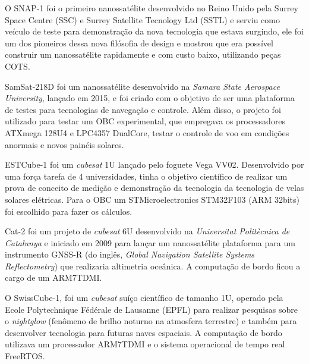 O SNAP-1 \cite{snap1_ref} foi o primeiro nanossatélite desenvolvido no Reino Unido pela Surrey Space Centre (SSC) e Surrey Satellite Tecnology Ltd (SSTL) e serviu como veículo de teste para demonstração da nova tecnologia que estava surgindo, ele foi um dos pioneiros dessa nova filósofia de design e mostrou que era possível construir um nanossatélite rapidamente e com custo baixo, utilizando peças COTS.

SamSat-218D \cite{samsat218_ref} foi um nanossatélite desenvolvido na \textit{Samara State Aerospace University}, lançado em 2015, e foi criado com o objetivo de ser uma plataforma de testes para tecnologias de navegação e controle. Além disso, o projeto foi utilizado para testar um OBC experimental, que empregava os processadores ATXmega 128U4 e LPC4357 DualCore, testar o controle de voo em condições anormais e novos painéis solares.

ESTCube-1 \cite{estcube1_ref} foi um \textit{cubesat} 1U lançado pelo foguete Vega VV02. Desenvolvido por uma força tarefa de 4 universidades, tinha o objetivo científico de realizar um prova de conceito de medição e demonstração da tecnologia da tecnologia de velas solares elétricas. Para o OBC um STMicroelectronics STM32F103 (ARM 32bits) foi escolhido para fazer os cálculos.

Cat-2 \cite{cat2_ref} foi um projeto de \textit{cubesat} 6U desenvolvido na \textit{Universitat Politècnica de Catalunya} e iniciado em 2009 para lançar um nanossatélite plataforma para um instrumento GNSS-R (do inglês, \textit{Global Navigation Satellite Systems Reflectometry}) que realizaria altimetria oceânica. A computação de bordo ficou a cargo de um ARM7TDMI.  

O SwissCube-1, \cite{swisscube_ref} foi um \textit{cubesat} suíço científico de tamanho 1U, operado pela Ecole Polytechnique Fédérale de Lausanne (EPFL) para realizar pesquisas sobre o \textit{nightglow} (fenômeno de brilho   noturno na atmosfera terrestre) e também para desenvolver tecnologia para futuras naves espaciais. A  computação  de  bordo utilizava um processador ARM7TDMI e o sistema operacional de tempo real FreeRTOS.



